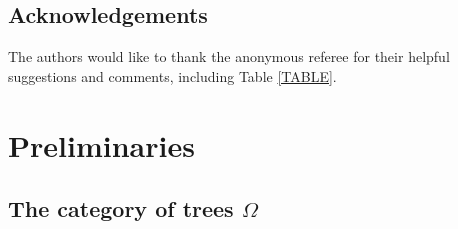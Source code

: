 \documentclass[a4paper,10pt
 ,draft
]{article}%
\begin{document}
\subsection{Acknowledgements}

The authors would like to thank the anonymous referee for their helpful suggestions and comments, 
including Table \ref{TABLE}.





\section{Preliminaries}\label{PREL SEC}

\subsection{The category of trees $\Omega$}
\end{document}
